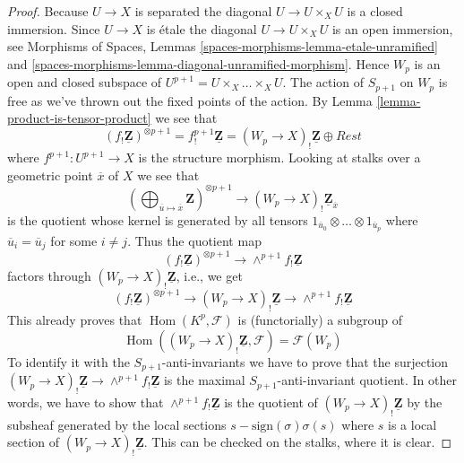 \documentclass[10pt,a4paper]{amsart}
\theoremstyle{plain}
\theoremstyle{definition}
\theoremstyle{remark}
\numberwithin{equation}{subsection}
\def\Hom{\mathop{\mathrm{Hom}}\nolimits}
\begin{document}
\begin{proof}
Because $U \to X$ is separated the diagonal $U \to U \times_X U$ is a
closed immersion. Since $U \to X$ is \'etale the diagonal
$U \to U \times_X U$ is an open immersion, see
Morphisms of Spaces, Lemmas
\ref{spaces-morphisms-lemma-etale-unramified} and
\ref{spaces-morphisms-lemma-diagonal-unramified-morphism}.
Hence $W_p$ is an open and closed subspace of
$U^{p + 1} = U \times_X \ldots \times_X U$. The action of $S_{p + 1}$
on $W_p$ is free as we've thrown out the fixed points of the action.
By
Lemma \ref{lemma-product-is-tensor-product}
we see that
$$
(f_!\underline{\mathbf{Z}})^{\otimes p + 1} =
f^{p + 1}_!\underline{\mathbf{Z}} = (W_p \to X)_!\underline{\mathbf{Z}}
\oplus Rest
$$
where $f^{p + 1} : U^{p + 1} \to X$ is the structure morphism.
Looking at stalks over a geometric point $\overline{x}$ of $X$
we see that
$$
\left(
\bigoplus\nolimits_{\overline{u} \mapsto \overline{x}} \mathbf{Z}
\right)^{\otimes p + 1}
\longrightarrow
(W_p \to X)_!\underline{\mathbf{Z}}_{\overline{x}}
$$
is the quotient whose kernel is generated by all tensors
$1_{\overline{u}_0} \otimes \ldots \otimes 1_{\overline{u}_p}$
where $\overline{u}_i = \overline{u}_j$ for some $i \not = j$.
Thus the quotient map
$$
(f_!\underline{\mathbf{Z}})^{\otimes p + 1}
\longrightarrow
\wedge^{p + 1}f_!\underline{\mathbf{Z}}
$$
factors through $(W_p \to X)_!\underline{\mathbf{Z}}$, i.e., we get
$$
(f_!\underline{\mathbf{Z}})^{\otimes p + 1}
\longrightarrow
(W_p \to X)_!\underline{\mathbf{Z}}
\longrightarrow
\wedge^{p + 1}f_!\underline{\mathbf{Z}}
$$
This already proves that $\Hom(K^p, \mathcal{F})$ is (functorially) a
subgroup of
$$
\Hom((W_p \to X)_!\underline{\mathbf{Z}}, \mathcal{F}) = \mathcal{F}(W_p)
$$
To identify it with the $S_{p + 1}$-anti-invariants we have to prove that
the surjection $(W_p \to X)_!\underline{\mathbf{Z}}
\to \wedge^{p + 1}f_!\underline{\mathbf{Z}}$ is the maximal
$S_{p + 1}$-anti-invariant quotient. In other words, we have to show that
$\wedge^{p + 1}f_!\underline{\mathbf{Z}}$ is the quotient of
$(W_p \to X)_!\underline{\mathbf{Z}}$ by the subsheaf generated by
the local sections $s - \text{sign}(\sigma)\sigma(s)$ where $s$ is
a local section of $(W_p \to X)_!\underline{\mathbf{Z}}$.
This can be checked on the stalks, where it is clear.
\end{proof}
\end{document}
